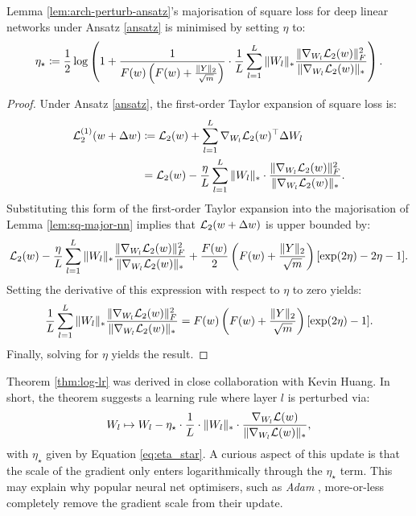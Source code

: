 \begin{refsection}
\begin{theorem}\label{thm:log-lr} Lemma \ref{lem:arch-perturb-ansatz}'s majorisation of square loss for deep linear networks under Ansatz \ref{ansatz} is minimised by setting $\eta$ to:
\begin{equation}\label{eq:eta_star}
    \eta_\star \coloneqq \frac{1}{2} \log\left(1 + \frac{1}{F(w)\left(F(w) + \frac{\Vert {Y} \Vert_2}{\sqrt{m}}\right)}\cdot \frac{1}{L}\sum_{l=1}^L \Vert {W_l} \Vert_* \frac{\Vert { \nabla_{W_l} \mathcal{L}_2(w)} \Vert_F^2}{\Vert { \nabla_{W_l} \mathcal{L}_2(w)} \Vert_*}\right).
\end{equation}
\end{theorem}
\begin{proof} 
    Under Ansatz \ref{ansatz}, the first-order Taylor expansion of square loss is:
    \begin{align*}
        \mathcal{L}_2^{(1)}(w+\Delta w) &\coloneqq \mathcal{L}_2(w) + \sum_{l=1}^L \nabla_{W_l}\mathcal{L}_2(w)^\top \Delta W_l \\
        &= \mathcal{L}_2(w) - \frac{\eta}{L}\sum_{l=1}^L \Vert {W_l} \Vert_* \cdot \frac{\Vert { \nabla_{W_l} \mathcal{L}_2(w)} \Vert_F^2}{\Vert { \nabla_{W_l} \mathcal{L}_2(w)} \Vert_*}.
    \end{align*}
    Substituting this form of the first-order Taylor expansion into the majorisation of Lemma \ref{lem:sq-major-nn} implies that $\mathcal{L}_2(w+\Delta w)$ is upper bounded by:
    \begin{equation*}
        \mathcal{L}_2(w) - \frac{\eta}{L}\sum_{l=1}^L \Vert {W_l} \Vert_* \frac{\Vert { \nabla_{W_l} \mathcal{L}_2(w)} \Vert_F^2}{\Vert { \nabla_{W_l} \mathcal{L}_2(w)} \Vert_*}  + \frac{F(w)}{2}\left(F(w) + \frac{\Vert {Y} \Vert_2}{\sqrt{m}}\right)[ \exp(2\eta) -2 \eta - 1 ].
    \end{equation*}
    Setting the derivative of this expression with respect to $\eta$ to zero yields:
    \begin{equation*}
        \frac{1}{L}\sum_{l=1}^L \Vert {W_l} \Vert_* \frac{\Vert { \nabla_{W_l} \mathcal{L}_2(w)} \Vert_F^2}{\Vert { \nabla_{W_l} \mathcal{L}_2(w)} \Vert_*}= F(w)\left(F(w) + \frac{\Vert {Y} \Vert_2}{\sqrt{m}}\right)[\exp(2\eta) -1 ].
    \end{equation*}
    Finally, solving for $\eta$ yields the result.
\end{proof}
Theorem \ref{thm:log-lr} was derived in close collaboration with Kevin Huang. In short, the theorem suggests a learning rule where layer $l$ is perturbed via:
\begin{equation}\label{eq:opt1}
    W_l \mapsto W_l - \eta_\star \cdot \frac{1}{L} \cdot \Vert {W_l} \Vert_* \cdot \frac{ \nabla_{W_l} \mathcal{L}(w)}{\Vert { \nabla_{W_l} \mathcal{L}(w)} \Vert_*},
\end{equation}
with $\eta_\star$ given by Equation \ref{eq:eta_star}. A curious aspect of this update is that the scale of the gradient only enters logarithmically through the $\eta_\star$ term. This may explain why popular neural net optimisers, such as \textit{Adam} \citep{kingma_adam:_2015}, more-or-less completely remove the gradient scale from their update.


\end{refsection}
